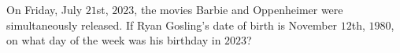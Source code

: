 On Friday, July $21$st, $2023$, the movies Barbie and Oppenheimer were simultaneously released. If Ryan Gosling's date of birth is November $12$th, $1980$, on what day of the week was his birthday in $2023$?
